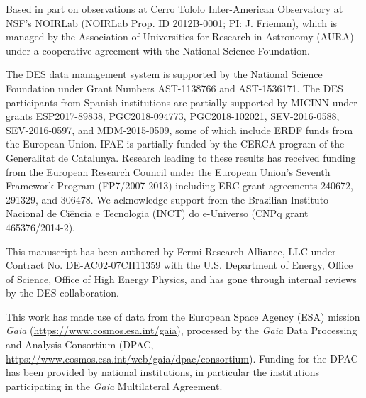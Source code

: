 \documentclass[onecolumn]{aastex631}
\begin{document}
Based in part on observations at Cerro Tololo Inter-American Observatory at NSF's NOIRLab (NOIRLab Prop. ID 2012B-0001; PI: J. Frieman), which is managed by the Association of Universities for Research in Astronomy (AURA) under a cooperative agreement with the National Science Foundation.

The DES data management system is supported by the National Science Foundation under Grant Numbers AST-1138766 and AST-1536171.
The DES participants from Spanish institutions are partially supported by MICINN under grants ESP2017-89838, PGC2018-094773, PGC2018-102021, SEV-2016-0588, SEV-2016-0597, and MDM-2015-0509, some of which include ERDF funds from the European Union. IFAE is partially funded by the CERCA program of the Generalitat de Catalunya.
Research leading to these results has received funding from the European Research
Council under the European Union's Seventh Framework Program (FP7/2007-2013) including ERC grant agreements 240672, 291329, and 306478.
We  acknowledge support from the Brazilian Instituto Nacional de Ci\^encia
e Tecnologia (INCT) do e-Universo (CNPq grant 465376/2014-2).

This manuscript has been authored by Fermi Research Alliance, LLC under Contract No. DE-AC02-07CH11359 with the U.S. Department of Energy, Office of Science, Office of High Energy Physics, and has gone through internal reviews by the DES collaboration.

This work has made use of data from the European Space Agency (ESA) mission
{\it Gaia} (\url{https://www.cosmos.esa.int/gaia}), processed by the {\it Gaia}
Data Processing and Analysis Consortium (DPAC,
\url{https://www.cosmos.esa.int/web/gaia/dpac/consortium}). Funding for the DPAC
has been provided by national institutions, in particular the institutions
participating in the {\it Gaia} Multilateral Agreement.

\newpage



\appendix
\end{document}
